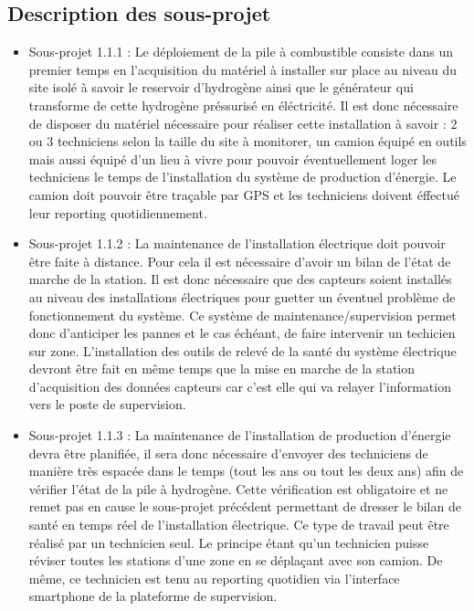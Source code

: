 \subsection{Description des sous-projet}

\begin{itemize}
\item Sous-projet 1.1.1 : Le déploiement de la pile à combustible consiste dans un premier temps en l'acquisition du matériel à installer sur place au niveau du site isolé à savoir le reservoir d'hydrogène ainsi que le générateur qui transforme de cette hydrogène préssurisé en éléctricité. Il est donc nécessaire de disposer du matériel nécessaire pour réaliser cette installation à savoir :  2 ou 3 techniciens selon la taille du site à monitorer, un camion équipé en outils mais aussi équipé d'un lieu à vivre pour pouvoir éventuellement loger les techniciens le temps de l'installation du système de production d'énergie. Le camion doit pouvoir être traçable par GPS et les techniciens doivent éffectué leur reporting quotidiennement.
\item Sous-projet 1.1.2 : La maintenance de l'installation électrique doit pouvoir être faite à distance. Pour cela il est nécessaire d'avoir un bilan de l'état de marche de la station. Il est donc nécessaire que des capteurs soient installés au niveau des installations électriques pour guetter un éventuel problème de fonctionnement du système. Ce système de maintenance/supervision permet donc d'anticiper les pannes et le cas échéant, de faire intervenir un techicien sur zone. L'installation des outils de relevé de la santé du système électrique devront être fait en même temps que la mise en marche de la station d'acquisition des données capteurs car c'est elle qui va relayer l'information vers le poste de supervision.
\item Sous-projet 1.1.3 : La maintenance de l'installation de production d'énergie devra être planifiée, il sera donc nécessaire d'envoyer des techniciens de manière très espacée dans le temps (tout les ans ou tout les deux ans) afin de vérifier l'état de la pile à hydrogène. Cette vérification est obligatoire et ne remet pas en cause le sous-projet précédent permettant de dresser le bilan de santé en temps réel de l'installation électrique. Ce type de travail peut être réalisé par un technicien seul. Le principe étant qu'un technicien puisse réviser toutes les stations d'une zone en se déplaçant avec son camion. De même, ce technicien est tenu au reporting quotidien via l'interface smartphone de la plateforme de supervision.

\end{itemize}
